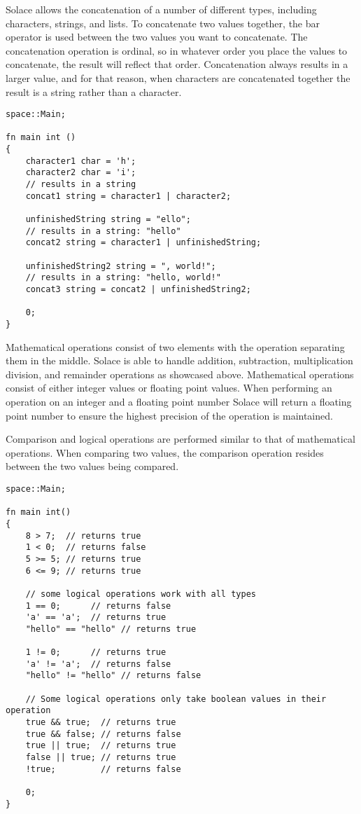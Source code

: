 \documentclass{article}
\begin{document}
Solace allows the concatenation of a number of different types, including characters, strings, and lists. To concatenate two values together, the bar operator 
is used between the two values you want to concatenate. The concatenation operation is ordinal, so in whatever order you place the values to concatenate, the
result will reflect that order. Concatenation always results in a larger value, and for that reason, when characters are concatenated together the result is a
string rather than a character.

\begin{lstlisting}
space::Main;

fn main int ()
{
	character1 char = 'h';
	character2 char = 'i';
	// results in a string
	concat1 string = character1 | character2;

	unfinishedString string = "ello";
	// results in a string: "hello"
	concat2 string = character1 | unfinishedString;

	unfinishedString2 string = ", world!";
	// results in a string: "hello, world!"
	concat3 string = concat2 | unfinishedString2;

	0;
}
\end{lstlisting}

Mathematical operations consist of two elements with the operation separating them in the middle. Solace is able to handle addition, subtraction, multiplication
division, and remainder operations as showcased above. Mathematical operations consist of either integer values or floating point values. When performing an
operation on an integer and a floating point number Solace will return a floating point number to ensure the highest precision of the operation is maintained.

Comparison and logical operations are performed similar to that of mathematical operations. When comparing two values, the comparison operation resides between the two
values being compared.

\begin{lstlisting}
space::Main;

fn main int()
{
	8 > 7;  // returns true
	1 < 0;  // returns false
	5 >= 5; // returns true
	6 <= 9; // returns true

	// some logical operations work with all types
	1 == 0;      // returns false
	'a' == 'a';  // returns true
	"hello" == "hello" // returns true

	1 != 0;      // returns true
	'a' != 'a';  // returns false
	"hello" != "hello" // returns false

	// Some logical operations only take boolean values in their operation
	true && true;  // returns true
	true && false; // returns false
	true || true;  // returns true
	false || true; // returns true
	!true;		   // returns false

	0;
}
\end{lstlisting}
\end{document}

